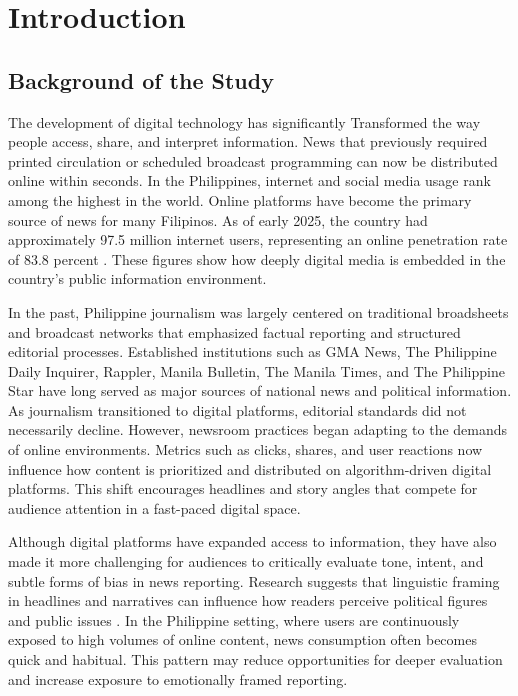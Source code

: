\section{Introduction}

\subsection{Background of the Study}
\label{background-of-the-study}

The development of digital technology has significantly Transformed the way people access, share, and interpret information. News that previously required printed circulation or scheduled broadcast programming can now be distributed online within seconds. In the Philippines, internet and social media usage rank among the highest in the world. Online platforms have become the primary source of news for many Filipinos. As of early 2025, the country had approximately 97.5 million internet users, representing an online penetration rate of 83.8 percent \cite{ref21}. These figures show how deeply digital media is embedded in the country's public information environment.

In the past, Philippine journalism was largely centered on traditional broadsheets and broadcast networks that emphasized factual reporting and structured editorial processes. Established institutions such as GMA News, The Philippine Daily Inquirer, Rappler, Manila Bulletin, The Manila Times, and The Philippine Star have long served as major sources of national news and political information. As journalism transitioned to digital platforms, editorial standards did not necessarily decline. However, newsroom practices began adapting to the demands of online environments. Metrics such as clicks, shares, and user reactions now influence how content is prioritized and distributed on algorithm-driven digital platforms. This shift encourages headlines and story angles that compete for audience attention in a fast-paced digital space.

Although digital platforms have expanded access to information, they have also made it more challenging for audiences to critically evaluate tone, intent, and subtle forms of bias in news reporting. Research suggests that linguistic framing in headlines and narratives can influence how readers perceive political figures and public issues \cite{ref03,ref04,ref11}. In the Philippine setting, where users are continuously exposed to high volumes of online content, news consumption often becomes quick and habitual. This pattern may reduce opportunities for deeper evaluation and increase exposure to emotionally framed reporting.

